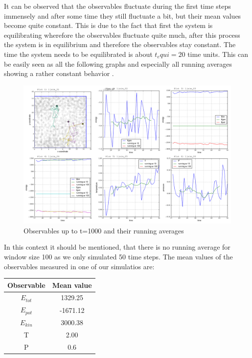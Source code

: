 \documentclass[12pt,a4paper]{scrartcl}
\begin{document}
It can be observed that the observables fluctuate during the first time steps immensely and after some time they still fluctuate a bit, but their mean values become quite constant. This is due to the fact that first the system is equilibrating wherefore the observables fluctuate quite much, after this process the system is in equilibrium and therefore the observables stay constant.
The time the system needs to be equilibrated is about $t_equi=20$ time units.
This can be easily seen as all the following graphs and especially all running averages showing a rather constant behavior .
\begin{figure}[H]
\centering
\includegraphics[width=16.0cm]{../plots/Tequi.png}
\caption{Observables up to t=1000 and their running averages}
\label{fig:running averages}
\end{figure}

In this context it should be mentioned, that there is no running average for window size 100 as we only simulated 50 time steps.
The mean values of the observables measured in one of our simulatios are:\newline
\begin{center}
\begin{tabular}{cc}
\toprule
Observable & Mean value\\
\midrule
$E_{tot}$&1329.25\\
$E_{pot}$&-1671.12\\
$E_{kin}$&3000.38\\
T&2.00\\
P&0.6\\
\bottomrule
\end{tabular}
\end{center}
\end{document}
